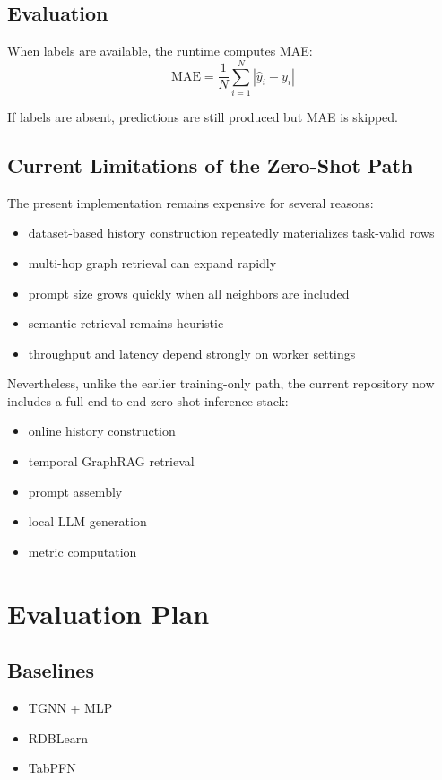 \documentclass[11pt]{article}
\begin{document}
\subsection{Evaluation}

When labels are available, the runtime computes MAE:
\begin{equation}
\mathrm{MAE} = \frac{1}{N}\sum_{i=1}^{N} |\hat{y}_i - y_i|
\end{equation}

If labels are absent, predictions are still produced but MAE is skipped.

\subsection{Current Limitations of the Zero-Shot Path}

The present implementation remains expensive for several reasons:
\begin{itemize}
\item dataset-based history construction repeatedly materializes task-valid rows
\item multi-hop graph retrieval can expand rapidly
\item prompt size grows quickly when all neighbors are included
\item semantic retrieval remains heuristic
\item throughput and latency depend strongly on worker settings
\end{itemize}

Nevertheless, unlike the earlier training-only path, the current repository now includes a full end-to-end zero-shot inference stack:
\begin{itemize}
\item online history construction
\item temporal GraphRAG retrieval
\item prompt assembly
\item local LLM generation
\item metric computation
\end{itemize}

\section{Evaluation Plan}

\subsection{Baselines}
\begin{itemize}
\item TGNN + MLP
\item RDBLearn
\item TabPFN
\end{itemize}
\end{document}
